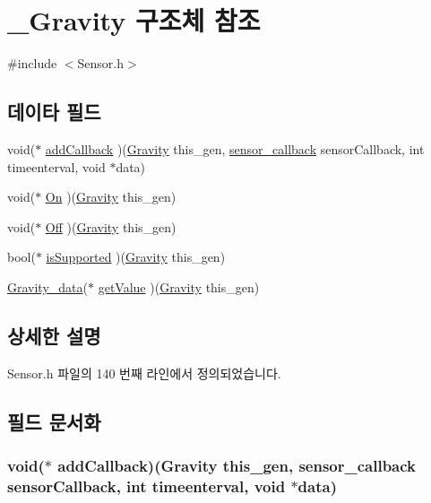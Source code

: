 \hypertarget{struct___gravity}{\section{\-\_\-\-Gravity 구조체 참조}
\label{struct___gravity}
}


{\ttfamily \#include $<$Sensor.\-h$>$}

\subsection*{데이타 필드}
\begin{DoxyCompactItemize}
\item 
void($\ast$ \hyperlink{struct___gravity_a5a8f94ec0d47531eddbb77969a91b790}{add\-Callback} )(\hyperlink{_sensor_8h_a4ceb392904d2aa4af24c1934cb8acb43}{Gravity} this\-\_\-gen, \hyperlink{_sensor_8h_ad8114207845fc5e0aa30832f0c718cd6}{sensor\-\_\-callback} sensor\-Callback, int timeenterval, void $\ast$data)
\item 
void($\ast$ \hyperlink{struct___gravity_a84c1b656c2161ac6e65f9d65ef3a71d6}{On} )(\hyperlink{_sensor_8h_a4ceb392904d2aa4af24c1934cb8acb43}{Gravity} this\-\_\-gen)
\item 
void($\ast$ \hyperlink{struct___gravity_a00ad5bd0e2b545812fceaaed88c0c48b}{Off} )(\hyperlink{_sensor_8h_a4ceb392904d2aa4af24c1934cb8acb43}{Gravity} this\-\_\-gen)
\item 
bool($\ast$ \hyperlink{struct___gravity_a64d7cabe8a37fd627a0fa93af3372ec6}{is\-Supported} )(\hyperlink{_sensor_8h_a4ceb392904d2aa4af24c1934cb8acb43}{Gravity} this\-\_\-gen)
\item 
\hyperlink{_sensor_8h_a6e9c581566bfca9e8c63cb6e4a703062}{Gravity\-\_\-data}($\ast$ \hyperlink{struct___gravity_afe837cce5c4d493eb3b48a65261d000d}{get\-Value} )(\hyperlink{_sensor_8h_a4ceb392904d2aa4af24c1934cb8acb43}{Gravity} this\-\_\-gen)
\end{DoxyCompactItemize}


\subsection{상세한 설명}


Sensor.\-h 파일의 140 번째 라인에서 정의되었습니다.



\subsection{필드 문서화}
\hypertarget{struct___gravity_a5a8f94ec0d47531eddbb77969a91b790}{
\subsubsection[{add\-Callback}]{\setlength{\rightskip}{0pt plus 5cm}void($\ast$  add\-Callback)({\bf Gravity} this\-\_\-gen, {\bf sensor\-\_\-callback} sensor\-Callback, int timeenterval, void $\ast$data)}}\label{struct___gravity_a5a8f94ec0d47531eddbb77969a91b790}


